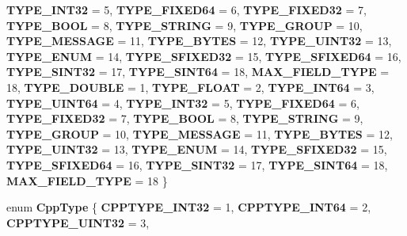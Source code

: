 \begin{DoxyCompactItemize}
{\bfseries T\+Y\+P\+E\+\_\+\+I\+N\+T32} = 5, 
{\bfseries T\+Y\+P\+E\+\_\+\+F\+I\+X\+E\+D64} = 6, 
{\bfseries T\+Y\+P\+E\+\_\+\+F\+I\+X\+E\+D32} = 7, 
{\bfseries T\+Y\+P\+E\+\_\+\+B\+O\+OL} = 8, 
\newline
{\bfseries T\+Y\+P\+E\+\_\+\+S\+T\+R\+I\+NG} = 9, 
{\bfseries T\+Y\+P\+E\+\_\+\+G\+R\+O\+UP} = 10, 
{\bfseries T\+Y\+P\+E\+\_\+\+M\+E\+S\+S\+A\+GE} = 11, 
{\bfseries T\+Y\+P\+E\+\_\+\+B\+Y\+T\+ES} = 12, 
\newline
{\bfseries T\+Y\+P\+E\+\_\+\+U\+I\+N\+T32} = 13, 
{\bfseries T\+Y\+P\+E\+\_\+\+E\+N\+UM} = 14, 
{\bfseries T\+Y\+P\+E\+\_\+\+S\+F\+I\+X\+E\+D32} = 15, 
{\bfseries T\+Y\+P\+E\+\_\+\+S\+F\+I\+X\+E\+D64} = 16, 
\newline
{\bfseries T\+Y\+P\+E\+\_\+\+S\+I\+N\+T32} = 17, 
{\bfseries T\+Y\+P\+E\+\_\+\+S\+I\+N\+T64} = 18, 
{\bfseries M\+A\+X\+\_\+\+F\+I\+E\+L\+D\+\_\+\+T\+Y\+PE} = 18, 
{\bfseries T\+Y\+P\+E\+\_\+\+D\+O\+U\+B\+LE} = 1, 
\newline
{\bfseries T\+Y\+P\+E\+\_\+\+F\+L\+O\+AT} = 2, 
{\bfseries T\+Y\+P\+E\+\_\+\+I\+N\+T64} = 3, 
{\bfseries T\+Y\+P\+E\+\_\+\+U\+I\+N\+T64} = 4, 
{\bfseries T\+Y\+P\+E\+\_\+\+I\+N\+T32} = 5, 
\newline
{\bfseries T\+Y\+P\+E\+\_\+\+F\+I\+X\+E\+D64} = 6, 
{\bfseries T\+Y\+P\+E\+\_\+\+F\+I\+X\+E\+D32} = 7, 
{\bfseries T\+Y\+P\+E\+\_\+\+B\+O\+OL} = 8, 
{\bfseries T\+Y\+P\+E\+\_\+\+S\+T\+R\+I\+NG} = 9, 
\newline
{\bfseries T\+Y\+P\+E\+\_\+\+G\+R\+O\+UP} = 10, 
{\bfseries T\+Y\+P\+E\+\_\+\+M\+E\+S\+S\+A\+GE} = 11, 
{\bfseries T\+Y\+P\+E\+\_\+\+B\+Y\+T\+ES} = 12, 
{\bfseries T\+Y\+P\+E\+\_\+\+U\+I\+N\+T32} = 13, 
\newline
{\bfseries T\+Y\+P\+E\+\_\+\+E\+N\+UM} = 14, 
{\bfseries T\+Y\+P\+E\+\_\+\+S\+F\+I\+X\+E\+D32} = 15, 
{\bfseries T\+Y\+P\+E\+\_\+\+S\+F\+I\+X\+E\+D64} = 16, 
{\bfseries T\+Y\+P\+E\+\_\+\+S\+I\+N\+T32} = 17, 
\newline
{\bfseries T\+Y\+P\+E\+\_\+\+S\+I\+N\+T64} = 18, 
{\bfseries M\+A\+X\+\_\+\+F\+I\+E\+L\+D\+\_\+\+T\+Y\+PE} = 18
 \}
\item 
\mbox{\label{classgoogle_1_1protobuf_1_1internal_1_1WireFormatLite_a14ea06b246adcaff4062c1e54e9a761d}} 
enum {\bfseries Cpp\+Type} \{ \newline
{\bfseries C\+P\+P\+T\+Y\+P\+E\+\_\+\+I\+N\+T32} = 1, 
{\bfseries C\+P\+P\+T\+Y\+P\+E\+\_\+\+I\+N\+T64} = 2, 
{\bfseries C\+P\+P\+T\+Y\+P\+E\+\_\+\+U\+I\+N\+T32} = 3, 

\end{DoxyCompactItemize}
